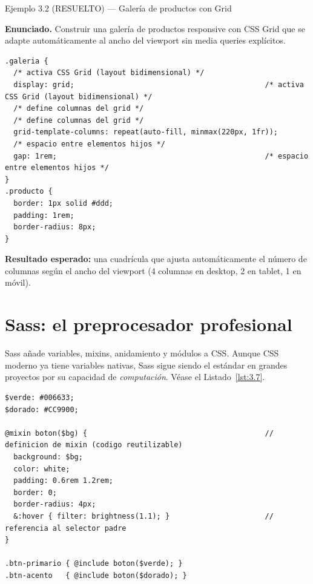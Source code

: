 \begin{cajaejemplo}{Ejemplo 3.2 (RESUELTO) --- Galería de productos con Grid}


\textbf{Enunciado.} Construir una galería de productos responsive con CSS Grid que se adapte automáticamente al ancho del viewport sin media queries explícitos.

\begin{lstlisting}[style=css,caption={galeria.css (fragmento)},label=lst:3.6]
.galeria {
  /* activa CSS Grid (layout bidimensional) */
  display: grid;                                            /* activa CSS Grid (layout bidimensional) */
  /* define columnas del grid */
  /* define columnas del grid */
  grid-template-columns: repeat(auto-fill, minmax(220px, 1fr));
  /* espacio entre elementos hijos */
  gap: 1rem;                                                /* espacio entre elementos hijos */
}
.producto {
  border: 1px solid #ddd;
  padding: 1rem;
  border-radius: 8px;
}
\end{lstlisting}

\textbf{Resultado esperado:} una cuadrícula que ajusta automáticamente
el número de columnas según el ancho del viewport (4 columnas en
desktop, 2 en tablet, 1 en móvil).

\end{cajaejemplo}

\section{Sass: el preprocesador profesional}

Sass añade variables, mixins, anidamiento y módulos a CSS. Aunque
CSS moderno ya tiene variables nativas, Sass sigue siendo el estándar
en grandes proyectos por su capacidad de \emph{computación}. V\'ease el Listado~\ref{lst:3.7}.

\begin{lstlisting}[style=sass,caption={ejemplo.scss},numbers=none,label=lst:3.7]
$verde: #006633;
$dorado: #CC9900;

@mixin boton($bg) {                                         // definicion de mixin (codigo reutilizable)
  background: $bg;
  color: white;
  padding: 0.6rem 1.2rem;
  border: 0;
  border-radius: 4px;
  &:hover { filter: brightness(1.1); }                      // referencia al selector padre
}

.btn-primario { @include boton($verde); }
.btn-acento   { @include boton($dorado); }
\end{lstlisting}

